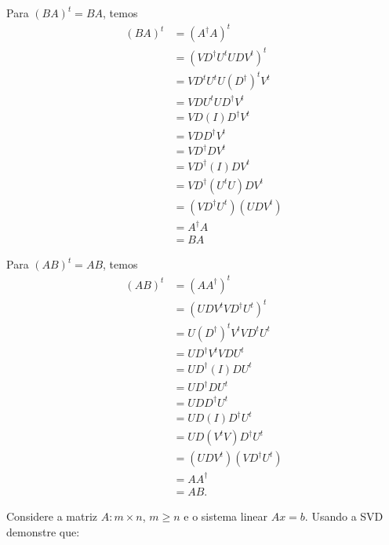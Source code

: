 \begin{questions}
\begin{solution}
        Para $\left( B A \right)^t = B A$, temos
        \begin{align*}
            \left( B A \right)^t &= \left( A^\dagger A \right)^t \\
            &= \left( V D^\dagger U^t U D V^t \right)^t \\
            &= V D^t U^t U (D^\dagger)^t V^t \\
            &= V D U^t U D^\dagger V^t \\
            &= V D \left( I \right) D^\dagger V^t \\
            &= V D D^\dagger V^t \\
            &= V D^\dagger D V^t \\
            &= V D^\dagger \left( I \right) D V^t \\
            &= V D^\dagger \left( U^t U \right) D V^t \\
            &= \left( V D^\dagger U^t \right) \left( U D V^t \right) \\
            &= A^\dagger A \\
            &= B A
        \end{align*}

        Para $\left( A B \right)^t = A B$, temos
        \begin{align*}
            \left( A B \right)^t &= \left( A A^\dagger \right)^t \\
            &= \left( U D V^t V D^\dagger U^t \right)^t \\
            &= U \left( D^\dagger \right)^t V^t V D^t U^t \\
            &= U D^\dagger V^t V D U^t \\
            &= U D^\dagger \left( I \right) D U^t \\
            &= U D^\dagger D U^t \\
            &= U D D^\dagger U^t \\
            &= U D \left( I \right) D^\dagger U^t \\
            &= U D \left( V^t V \right) D^\dagger U^t \\
            &= \left( U D V^t \right) \left( V D^\dagger U^t \right) \\
            &= A A^\dagger \\
            &= A B.
        \end{align*}
    \end{solution}

    \question Considere a matriz $A : m \times n$, $m \geq n$ e o sistema linear $A x = b$. Usando a SVD demonstre que:
    \begin{parts}

\end{parts}
\end{questions}

